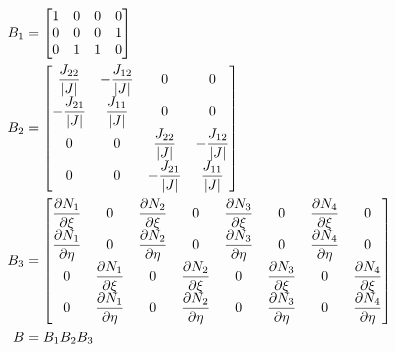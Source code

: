 \documentclass[11pt]{article}
\begin{document}
\begin{align}
    B_1 & = \begin{bmatrix}
        1 & 0 & 0 & 0 \\
        0 & 0 & 0 & 1 \\
        0 & 1 & 1 & 0
    \end{bmatrix} \\
    B_2 & = \begin{bmatrix}
        \dfrac{J_{22}}{\abs{J}}  & -\dfrac{J_{12}}{\abs{J}} & 0                        & 0                        \\
        -\dfrac{J_{21}}{\abs{J}} & \dfrac{J_{11}}{\abs{J}}  & 0                        & 0                        \\
        0                        & 0                        & \dfrac{J_{22}}{\abs{J}}  & -\dfrac{J_{12}}{\abs{J}} \\
        0                        & 0                        & -\dfrac{J_{21}}{\abs{J}} & \dfrac{J_{11}}{\abs{J}}
    \end{bmatrix} \\
    B_3 & =\begin{bmatrix}
        \dfrac{\partial N_1}{\partial \xi}  & 0                                   & \dfrac{\partial N_2}{\partial \xi}  & 0                                   & \dfrac{\partial N_3}{\partial \xi}  & 0                                   & \dfrac{\partial N_4}{\partial \xi}  & 0                                   \\
        \dfrac{\partial N_1}{\partial \eta} & 0                                   & \dfrac{\partial N_2}{\partial \eta} & 0                                   & \dfrac{\partial N_3}{\partial \eta} & 0                                   & \dfrac{\partial N_4}{\partial \eta} & 0                                   \\
        0                                   & \dfrac{\partial N_1}{\partial \xi}  & 0                                   & \dfrac{\partial N_2}{\partial \xi}  & 0                                   & \dfrac{\partial N_3}{\partial \xi}  & 0                                   & \dfrac{\partial N_4}{\partial \xi}  \\
        0                                   & \dfrac{\partial N_1}{\partial \eta} & 0                                   & \dfrac{\partial N_2}{\partial \eta} & 0                                   & \dfrac{\partial N_3}{\partial \eta} & 0                                   & \dfrac{\partial N_4}{\partial \eta} \\
    \end{bmatrix}  \\
    B   & = B_1 B_2 B_3
\end{align}
\end{document}
